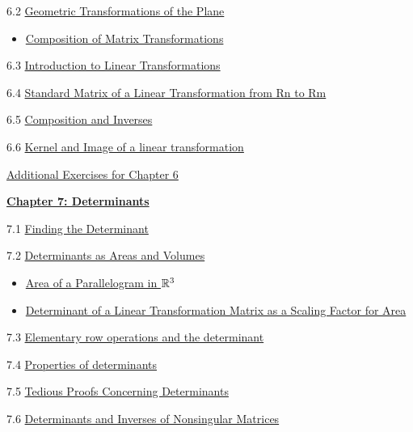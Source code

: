 \documentclass{ximera}
\begin{document}
6.2	\href{https://ximera.osu.edu/oerlinalg/LinearAlgebra/LTR-0070/main}{Geometric Transformations of the Plane}
\begin{itemize}
    \item 
    \href{https://www.geogebra.org/m/d6jyt85s}{Composition of Matrix Transformations}
\end{itemize}
	
6.3	\href{https://ximera.osu.edu/oerlinalg/LinearAlgebra/LTR-0010/main}{Introduction to Linear Transformations}
	
6.4	\href{https://ximera.osu.edu/oerlinalg/LinearAlgebra/LTR-0020/main}{Standard Matrix of a Linear Transformation from Rn to Rm}
	
6.5	\href{https://ximera.osu.edu/oerlinalg/LinearAlgebra/LTR-0030/main}{Composition and Inverses}
	
6.6	\href{https://ximera.osu.edu/oerlinalg/LinearAlgebra/LTR-0050/main}{Kernel and Image of a linear transformation}
	
\href{https://ximera.osu.edu/oerlinalg/LinearAlgebra/SUPX-0060/main}{Additional Exercises for Chapter 6}
	
\href{https://ximera.osu.edu/oerlinalg/LinearAlgebra/XLAChapter_det/main}{\textbf{Chapter 7: Determinants}}
	
7.1	\href{https://ximera.osu.edu/oerlinalg/LinearAlgebra/DET-0010/main}{Finding the Determinant}
	
7.2	\href{https://ximera.osu.edu/oerlinalg/LinearAlgebra/DET-0070/main}{Determinants as Areas and Volumes}
\begin{itemize}
    \item 
    \href{https://www.geogebra.org/m/g7g6kjqm}{Area of a Parallelogram in $\mathbb{R}^3$}
    \item
    \href{https://www.geogebra.org/m/nr8jsz4w}{Determinant of a Linear Transformation Matrix as a Scaling Factor for Area}
\end{itemize}
	
7.3	\href{https://ximera.osu.edu/oerlinalg/LinearAlgebra/DET-0030/main}{Elementary row operations and the determinant}
	
7.4	\href{https://ximera.osu.edu/oerlinalg/LinearAlgebra/DET-0040/main}{Properties of determinants}
	
7.5	\href{https://ximera.osu.edu/oerlinalg/LinearAlgebra/DET-0050/main}{Tedious Proofs Concerning Determinants}
	
7.6	\href{https://ximera.osu.edu/oerlinalg/LinearAlgebra/DET-0060/main}{Determinants and Inverses of Nonsingular Matrices}
	
\end{document}
